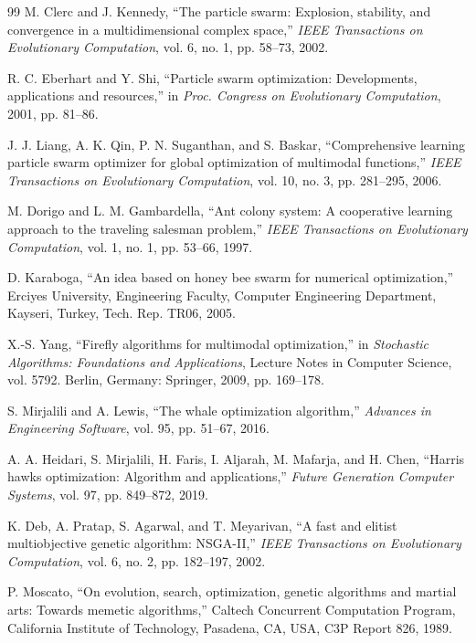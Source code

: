 \documentclass[a4paper,fleqn]{cas-sc}
\begin{document}
\begin{thebibliography}{99}
M. Clerc and J. Kennedy, ``The particle swarm: Explosion, stability, and convergence in a multidimensional complex space,'' \emph{IEEE Transactions on Evolutionary Computation}, vol. 6, no. 1, pp. 58--73, 2002.

R. C. Eberhart and Y. Shi, ``Particle swarm optimization: Developments, applications and resources,'' in \emph{Proc. Congress on Evolutionary Computation}, 2001, pp. 81--86.

J. J. Liang, A. K. Qin, P. N. Suganthan, and S. Baskar, ``Comprehensive learning particle swarm optimizer for global optimization of multimodal functions,'' \emph{IEEE Transactions on Evolutionary Computation}, vol. 10, no. 3, pp. 281--295, 2006.

M. Dorigo and L. M. Gambardella, ``Ant colony system: A cooperative learning approach to the traveling salesman problem,'' \emph{IEEE Transactions on Evolutionary Computation}, vol. 1, no. 1, pp. 53--66, 1997.

D. Karaboga, ``An idea based on honey bee swarm for numerical optimization,'' Erciyes University, Engineering Faculty, Computer Engineering Department, Kayseri, Turkey, Tech. Rep. TR06, 2005.

X.-S. Yang, ``Firefly algorithms for multimodal optimization,'' in \emph{Stochastic Algorithms: Foundations and Applications}, Lecture Notes in Computer Science, vol. 5792. Berlin, Germany: Springer, 2009, pp. 169--178.

S. Mirjalili and A. Lewis, ``The whale optimization algorithm,'' \emph{Advances in Engineering Software}, vol. 95, pp. 51--67, 2016.

A. A. Heidari, S. Mirjalili, H. Faris, I. Aljarah, M. Mafarja, and H. Chen, ``Harris hawks optimization: Algorithm and applications,'' \emph{Future Generation Computer Systems}, vol. 97, pp. 849--872, 2019.

K. Deb, A. Pratap, S. Agarwal, and T. Meyarivan, ``A fast and elitist multiobjective genetic algorithm: NSGA-II,'' \emph{IEEE Transactions on Evolutionary Computation}, vol. 6, no. 2, pp. 182--197, 2002.

P. Moscato, ``On evolution, search, optimization, genetic algorithms and martial arts: Towards memetic algorithms,'' Caltech Concurrent Computation Program, California Institute of Technology, Pasadena, CA, USA, C3P Report 826, 1989.


\end{thebibliography}
\end{document}
